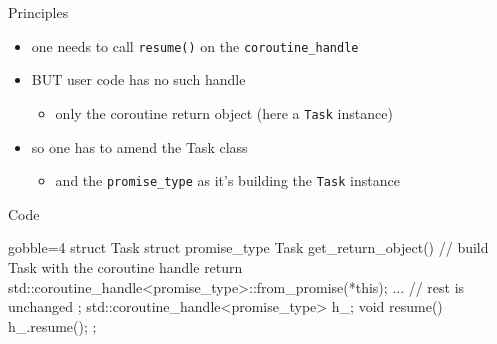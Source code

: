 \begin{frame}[fragile]
  \begin{block}{Principles}
    \begin{itemize}
    \item one needs to call \texttt{resume()} on the \texttt{coroutine_handle}
    \item BUT user code has no such handle
      \begin{itemize}
      \item only the coroutine return object (here a \texttt{Task} instance)
      \end{itemize}
    \item so one has to amend the Task class
      \begin{itemize}
      \item and the \texttt{promise_type} as it's building the \texttt{Task} instance
      \end{itemize}
    \end{itemize}
  \end{block}
  \begin{exampleblock}{Code}
    {\scriptsize
      \begin{cppcode*}{gobble=4}
        struct Task {
          struct promise_type {
            Task get_return_object() {
              // build Task with the coroutine handle
              return {std::coroutine_handle<promise_type>::from_promise(*this)};
            }
            ... // rest is unchanged
          };
          std::coroutine_handle<promise_type> h_;
          void resume() { h_.resume(); }
        };
      \end{cppcode*}
    }
  \end{exampleblock}
\end{frame}

